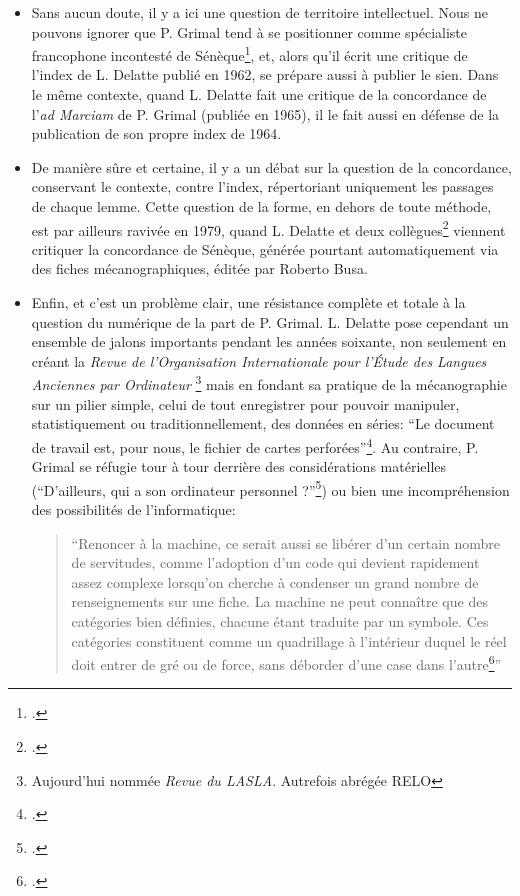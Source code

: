 \begin{itemize}
    \item Sans aucun doute, il y a ici une question de territoire intellectuel. Nous ne pouvons ignorer que P. Grimal tend à se positionner comme spécialiste francophone incontesté de Sénèque\footcite{verdiere_pierre_1970}, et, alors qu'il écrit une critique de l'index de L. Delatte publié en 1962, se prépare aussi à publier le sien. Dans le même contexte, quand L. Delatte fait une critique de la concordance de l'\textit{ad Marciam} de P. Grimal (publiée en 1965), il le fait aussi en défense de la publication de son propre index de 1964.
    \item De manière sûre et certaine, il y a un débat sur la question de la concordance, conservant le contexte, contre l'index, répertoriant uniquement les passages de chaque lemme. Cette question de la forme, en dehors de toute méthode, est par ailleurs ravivée en 1979, quand L. Delatte et deux collègues\footcite{delatte_concordantiae_1979} viennent critiquer la concordance de Sénèque, générée pourtant automatiquement via des fiches mécanographiques, éditée par Roberto Busa.
    \item Enfin, et c'est un problème clair, une résistance complète et totale à la question du numérique de la part de P. Grimal. L. Delatte pose cependant un ensemble de jalons importants pendant les années soixante, non seulement en créant la \textit{Revue de l'Organisation Internationale pour l'Étude des Langues Anciennes par Ordinateur} \footnote{Aujourd'hui nommée \textit{Revue du LASLA}. Autrefois abrégée RELO} mais en fondant sa pratique de la mécanographie sur un pilier simple, celui de tout enregistrer pour pouvoir manipuler, statistiquement ou traditionnellement, des données en séries: \enquote{Le document de travail est, pour nous, le fichier de cartes perforées}\footcite[p~.202]{delatte_index_1968}. Au contraire, P. Grimal se réfugie tour à tour derrière des considérations matérielles (\enquote{D’ailleurs, qui a son ordinateur personnel ?}\footcite[p.~111]{grimal_index_1966}) ou bien une incompréhension des possibilités de l'informatique:
    
    \blockquote{\enquote{Renoncer à la machine, ce serait aussi se libérer d'un certain nombre de servitudes, comme l'adoption d'un code qui devient rapidement assez complexe lorsqu'on cherche à condenser un grand nombre de renseignements sur une fiche. La machine ne peut connaître que des catégories bien définies, chacune étant traduite par un symbole. Ces catégories constituent comme un quadrillage à l'intérieur duquel le réel doit entrer de gré ou de force, sans déborder d'une case dans l'autre\footcite[p.~131]{grimal_delatte_1964}}}
\end{itemize}

